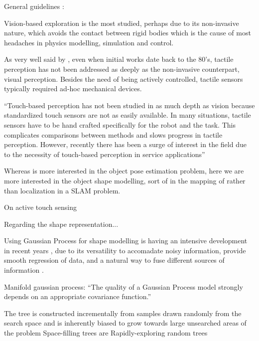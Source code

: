 
General guidelines : \citet{Bajcsy1989Machine}

Vision-based exploration is the most studied, perhaps due to its non-invasive nature, which avoids the contact between rigid bodies which is the cause of most headaches in physics modelling, simulation and control.

As very well said by \citet{Petrovskaya2011Global}, even when initial works date back to the 80's, tactile perception has not been addressed as deeply as the non-invasive counterpart, visual perception. Besides the need of being actively controlled, tactile sensors typically required ad-hoc mechanical devices.

``Touch-based perception has not been studied in as much depth
as vision because standardized touch sensors are not as easily
available. In many situations, tactile sensors have to be hand
crafted specifically for the robot and the task. This complicates
comparisons between methods and slows progress in tactile
perception. However, recently there has been a surge of interest
in the field due to the necessity of touch-based perception in
service applications''

Whereas \citet{Petrovskaya2011Global} is more interested in the object pose estimation problem, here we are more interested in the object shape modelling, sort of in the mapping of rather than localization in a SLAM problem.

On active touch sensing \citet{Prescott2011Active}


Regarding the shape representation...

Using Gaussian Process for shape modelling is having an intensive development in recent years \citep{Mahler2015Grasp,Rosales2014Active,Bjorkman2013Enhancing,Dragiev2011Gaussian}, due to its versatility to accomadate noisy information, provide smooth regression of data, and a natural way to fuse different sources of information \citep{Rasmussen2006Gaussian}.

Manifold gaussian process: \citet{Calandra2014Manifold} ``The quality of a Gaussian Process model strongly depends on an appropriate covariance function.''

The tree is constructed incrementally from samples drawn randomly from the search space and is inherently biased to grow towards large unsearched areas of the problem
Space-filling trees are 
Rapidly-exploring random trees \citet{LaValle2011Motion}

